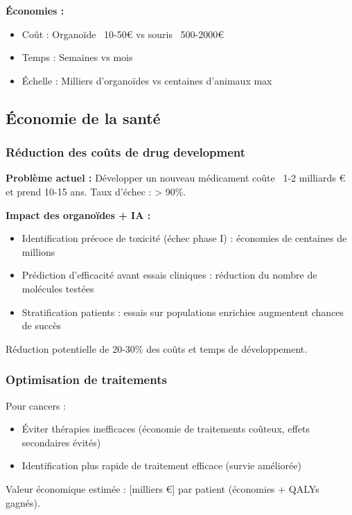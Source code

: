\textbf{Économies :}
\begin{itemize}
    \item Coût : Organoïde ~10-50€ vs souris ~500-2000€
    \item Temps : Semaines vs mois
    \item Échelle : Milliers d'organoïdes vs centaines d'animaux max
\end{itemize}

\subsection{Économie de la santé}

\subsubsection{Réduction des coûts de drug development}

\textbf{Problème actuel :}
Développer un nouveau médicament coûte ~1-2 milliards € et prend 10-15 ans. Taux d'échec : > 90\%.

\textbf{Impact des organoïdes + IA :}
\begin{itemize}
    \item Identification précoce de toxicité (échec phase I) : économies de centaines de millions
    \item Prédiction d'efficacité avant essais cliniques : réduction du nombre de molécules testées
    \item Stratification patients : essais sur populations enrichies augmentent chances de succès
\end{itemize}

Réduction potentielle de 20-30\% des coûts et temps de développement.

\subsubsection{Optimisation de traitements}

Pour cancers :
\begin{itemize}
    \item Éviter thérapies inefficaces (économie de traitements coûteux, effets secondaires évités)
    \item Identification plus rapide de traitement efficace (survie améliorée)
\end{itemize}

Valeur économique estimée : [milliers €] par patient (économies + QALYs gagnés).

